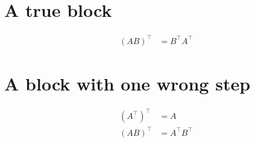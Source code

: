 \documentclass{article}
\begin{document}
\section{A true block}
\begin{align*}
(A B)^\top &= B^\top A^\top
\end{align*}
\section{A block with one wrong step}
\begin{align*}
(A^\top)^\top &= A \\
(A B)^\top &= A^\top B^\top
\end{align*}
\end{document}
